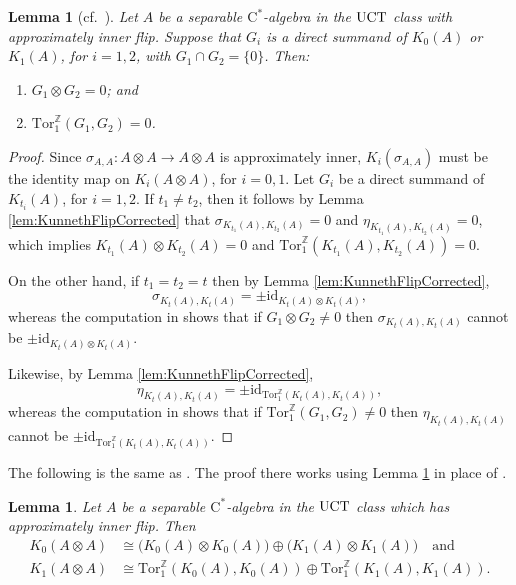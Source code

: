 \documentclass[a4paper,10pt]{amsart}
\newcommand{\T}[1]{\textup{#1}}
\newcommand{\cstar}{\ensuremath{\mathrm C^\ast}}
\newcounter{theorem}
\newtheorem{lemma}[theorem]{Lemma}
\numberwithin{equation}{section}
\numberwithin{theorem}{section}
\newcommand{\Z}{\mathbb{Z}}
\newcommand{\Tor}{\mathrm{Tor}_1^{\Z}}
\newcommand{\id}{\mathrm{id}}
\begin{document}
\begin{lemma}[{cf.\ \cite[Lemma 6.2]{aifK}}]
\label{lem:BasicRestrictions}
Let $A$ be a separable $\cstar$-algebra in the $\T{UCT}$ class with approximately inner flip.
Suppose that $G_i$ is a direct summand of $K_0(A)$ or $K_1(A)$, for $i=1,2$, with $G_1\cap G_2 = \{0\}$.
Then:
\begin{enumerate}
\item $G_1 \otimes G_2 = 0$; and
\item $\Tor(G_1,G_2)=0$.
\end{enumerate}
\end{lemma}

\begin{proof}
Since $\sigma_{A,A}:A\otimes A \to A \otimes A$ is approximately inner, $K_i(\sigma_{A,A})$ must be the identity map on $K_i(A\otimes A)$, for $i=0,1$.
Let $G_i$ be a direct summand of $K_{t_i}(A)$, for $i=1,2$.
If $t_1\neq t_2$, then it follows by Lemma \ref{lem:KunnethFlipCorrected} that $\sigma_{K_{t_1}(A),K_{t_2}(A)}=0$ and $\eta_{K_{t_1}(A),K_{t_2}(A)}=0$, which implies $K_{t_1}(A)\otimes K_{t_2}(A)=0$ and $\Tor(K_{t_1}(A),K_{t_2}(A))=0$.

On the other hand, if $t_1=t_2=t$ then by Lemma \ref{lem:KunnethFlipCorrected}, 
\[ \sigma_{K_{t}(A),K_{t}(A)} = \pm\id_{K_{t}(A)\otimes K_{t}(A)}, \]
whereas the computation in \cite[Lemma 6.2]{aifK} shows that if $G_1\otimes G_2\neq 0$ then $\sigma_{K_t(A),K_t(A)}$ cannot be $\pm\id_{K_t(A)\otimes K_t(A)}$.

Likewise, by Lemma \ref{lem:KunnethFlipCorrected},
\[ \eta_{K_{t}(A),K_{t}(A)} = \pm\id_{\Tor(K_{t}(A),K_{t}(A))}, \]
whereas the computation in \cite[Lemma 6.2]{aifK} shows that if $\Tor(G_1,G_2)\neq 0$ then $\eta_{K_t(A),K_t(A)}$ cannot be $\pm\id_{\Tor(K_t(A),K_t(A))}$.
\end{proof}

The following is the same as \cite[Lemma 6.3]{aifK}. The proof there works using Lemma \ref{lem:BasicRestrictions} in place of \cite[Lemma 6.2]{aifK}.

\begin{lemma}
\label{lem:TensorKComp}
Let $A$ be a separable $\cstar$-algebra in the $\T{UCT}$ class which has approximately inner flip.
Then 
\begin{align*}
K_0(A \otimes A) &\cong \big(K_0(A) \otimes K_0(A)\big) \oplus \big(K_1(A) \otimes K_1(A)\big) \quad \text{and} \\
K_1(A \otimes A) &\cong \Tor(K_0(A),K_0(A)) \oplus \Tor(K_1(A),K_1(A)).
\end{align*}
\end{lemma}
\end{document}
